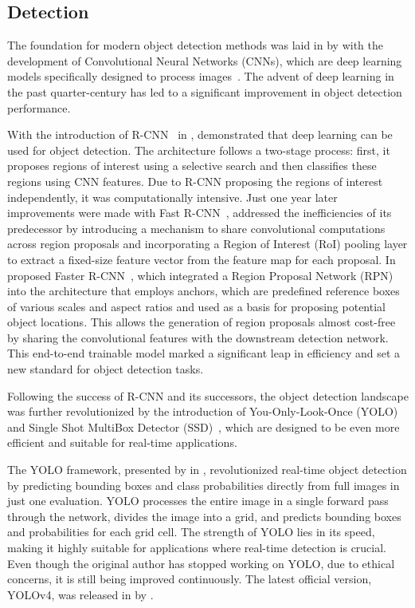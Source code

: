 \subsection{Detection}\label{subsec:milestone_detection}
The foundation for modern object detection methods was laid in \citeyear{Lecun98} by \citeauthor{Lecun98} with the development of Convolutional Neural Networks (CNNs), which are deep learning models specifically designed to process images~\cite{Lecun98}. The advent of deep learning in the past quarter-century has led to a significant improvement in object detection performance.

With the introduction of R-CNN~\cite{Girshick14} in \citeyear{Girshick14}, \citeauthor{Girshick14} demonstrated that deep learning can be used for object detection. The architecture follows a two-stage process: first, it proposes regions of interest using a selective search and then classifies these regions using CNN features. Due to R-CNN proposing the regions of interest independently, it was computationally intensive. Just one year later improvements were made with Fast R-CNN~\cite{Girshick15}, addressed the inefficiencies of its predecessor by introducing a mechanism to share convolutional computations across region proposals and incorporating a Region of Interest (RoI) pooling layer to extract a fixed-size feature vector from the feature map for each proposal. In \citeyear{Ren17} \citeauthor{Ren17} proposed Faster R-CNN~\cite{Ren17}, which integrated a Region Proposal Network (RPN) into the architecture that employs anchors, which are predefined reference boxes of various scales and aspect ratios and used as a basis for proposing potential object locations. This allows the generation of region proposals almost cost-free by sharing the convolutional features with the downstream detection network. This end-to-end trainable model marked a significant leap in efficiency and set a new standard for object detection tasks.

Following the success of R-CNN and its successors, the object detection landscape was further revolutionized by the introduction of You-Only-Look-Once (YOLO)~\cite{Redmon15} and Single Shot MultiBox Detector (SSD)~\cite{Liu15}, which are designed to be even more efficient and suitable for real-time applications.

The YOLO framework, presented by \citeauthor{Redmon15} in \citeyear{Redmon15}, revolutionized real-time object detection by predicting bounding boxes and class probabilities directly from full images in just one evaluation. YOLO processes the entire image in a single forward pass through the network, divides the image into a grid, and predicts bounding boxes and probabilities for each grid cell. The strength of YOLO lies in its speed, making it highly suitable for applications where real-time detection is crucial. Even though the original author has stopped working on YOLO, due to ethical concerns, it is still being improved continuously. The latest official version, YOLOv4, was released in \citeyear{Bochkovskiy20} by \textcite{Bochkovskiy20}.

